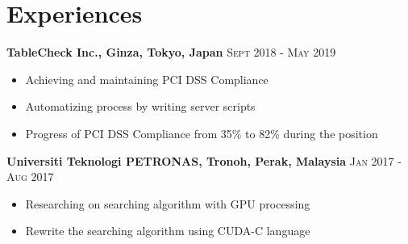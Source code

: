 \section{Experiences}
\vspace{-0.3cm}
\textbf{TableCheck Inc., Ginza, Tokyo, Japan} 
    \quad \quad \quad \quad \quad \quad \quad \quad \quad 
    \quad \quad \quad \quad \quad \quad \quad \quad
\textsc{Sept 2018 - May 2019} \\
 \vspace{-0.15cm}
    \begin{itemize}[noitemsep]
        \item Achieving and maintaining PCI DSS Compliance
        \item Automatizing process by writing server scripts
        \item Progress of PCI DSS Compliance from 35\% to 82\% during the position
    \end{itemize}

\textbf{Universiti Teknologi PETRONAS, Tronoh, Perak, Malaysia} 
    \quad \quad \quad \quad \quad \quad \quad \quad \quad 
\textsc{Jan 2017 - Aug 2017} \\
 \vspace{-0.15cm}
    \begin{itemize}[noitemsep]
        \item Researching on searching algorithm with GPU processing
        \item Rewrite the searching algorithm using CUDA-C language
    \end{itemize}